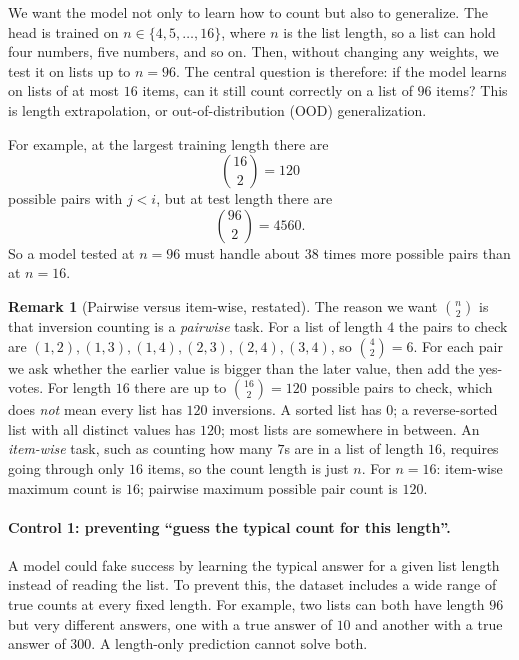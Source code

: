 \documentclass[10pt]{article}
\theoremstyle{definition}
\newtheorem{remark}{Remark}
\begin{document}
\label{sec:extrap}

We want the model not only to learn how to count but also to generalize.
The head is trained on $n \in \{4, 5, \dots, 16\}$, where $n$ is the list
length, so a list can hold four numbers, five numbers, and so on. Then,
without changing any weights, we test it on lists up to $n = 96$. The
central question is therefore: if the model learns on lists of at most
$16$ items, can it still count correctly on a list of $96$ items? This is
length extrapolation, or out-of-distribution (OOD) generalization.

For example, at the largest training length there are
\[
\binom{16}{2} = 120
\]
possible pairs with $j < i$, but at test length there are
\[
\binom{96}{2} = 4560 .
\]
So a model tested at $n = 96$ must handle about $38$ times more possible
pairs than at $n = 16$.

\begin{remark}[Pairwise versus item-wise, restated]
\label{rem:pair-vs-item}
The reason we want $\binom{n}{2}$ is that inversion counting is a
\emph{pairwise} task. For a list of length $4$ the pairs to check are
$(1,2), (1,3), (1,4), (2,3), (2,4), (3,4)$, so $\binom{4}{2} = 6$. For
each pair we ask whether the earlier value is bigger than the later value,
then add the yes-votes. For length $16$ there are up to $\binom{16}{2} =
120$ possible pairs to check, which does \emph{not} mean every list has
$120$ inversions. A sorted list has $0$; a reverse-sorted list with all
distinct values has $120$; most lists are somewhere in between. An
\emph{item-wise} task, such as counting how many $7$s are in a list of
length $16$, requires going through only $16$ items, so the count length
is just $n$. For $n = 16$: item-wise maximum count is $16$; pairwise
maximum possible pair count is $120$.
\end{remark}

\label{sec:controls}

\paragraph{Control 1: preventing ``guess the typical count for this
length''.}
A model could fake success by learning the typical answer for a given list
length instead of reading the list. To prevent this, the dataset includes a
wide range of true counts at every fixed length. For example, two lists can
both have length $96$ but very different answers, one with a true answer
of $10$ and another with a true answer of $300$. A length-only prediction
cannot solve both.
\end{document}

